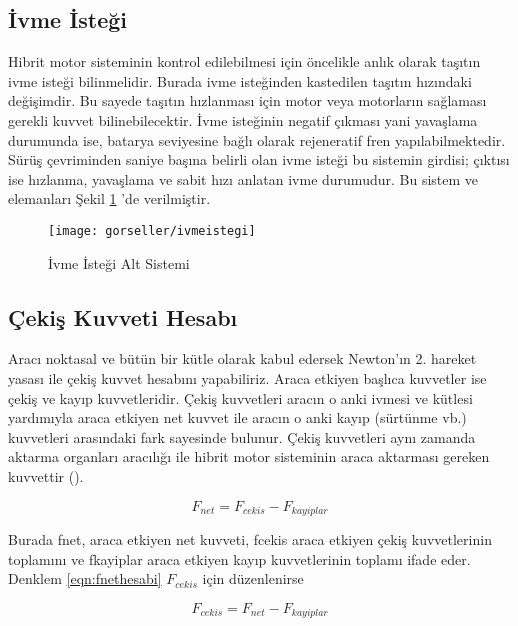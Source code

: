 \subsection{İvme İsteği}
Hibrit motor sisteminin kontrol edilebilmesi için öncelikle anlık olarak taşıtın ivme isteği bilinmelidir. Burada ivme isteğinden kastedilen taşıtın hızındaki değişimdir. Bu sayede taşıtın 
hızlanması için motor veya motorların sağlaması gerekli kuvvet bilinebilecektir. İvme isteğinin negatif çıkması yani yavaşlama durumunda ise, batarya seviyesine bağlı olarak rejeneratif fren yapılabilmektedir. 
Sürüş çevriminden saniye başına belirli olan ivme isteği bu sistemin girdisi; çıktısı ise hızlanma, yavaşlama ve sabit hızı anlatan ivme durumudur. 
Bu sistem ve elemanları Şekil \ref{fig:ivmeistegi} 'de verilmiştir.

\begin{figure}[h]
    \centering
    \texttt{[image: gorseller/ivmeistegi]}
    \caption{İvme İsteği Alt Sistemi}\label{fig:ivmeistegi}
\end{figure}


\subsection{Çekiş Kuvveti Hesabı}

Aracı noktasal ve bütün bir kütle olarak kabul edersek Newton'ın 2. hareket yasası ile çekiş kuvvet hesabını yapabiliriz.
Araca etkiyen başlıca kuvvetler ise çekiş ve kayıp kuvvetleridir. Çekiş kuvvetleri aracın o anki ivmesi ve kütlesi yardımıyla araca etkiyen net kuvvet ile aracın o anki 
kayıp (sürtünme vb.) kuvvetleri arasındaki fark sayesinde bulunur. Çekiş kuvvetleri aynı zamanda aktarma organları aracılığı ile hibrit motor sisteminin araca aktarması 
gereken kuvvettir (\cite{vehdynctrl}).

\begin{equation}
    \label{eqn:fnethesabi}
    F_{net}=F_{cekis}-F_{kayiplar}
\end{equation}

Burada \acrshort{fnet}, araca etkiyen net kuvveti, \acrshort{fcekis} araca etkiyen çekiş kuvvetlerinin
toplamını ve \acrshort{fkayiplar} araca etkiyen kayıp kuvvetlerinin toplamı ifade eder. Denklem \ref{eqn:fnethesabi} $F_{cekis}$ için düzenlenirse

\begin{equation}
    \label{eqn:fcekishesabi}
    F_{cekis}=F_{net}-F_{kayiplar} 
\end{equation}

